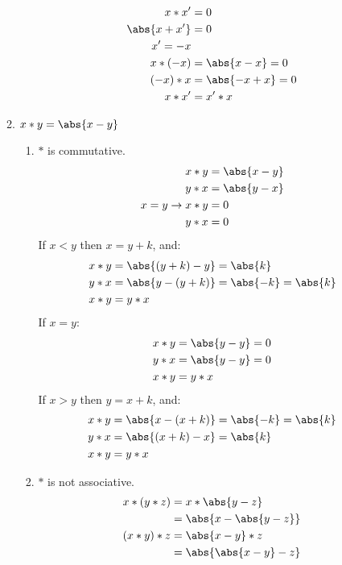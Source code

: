 \begin{enumerate}[label={\Alph*.},font={\bfseries}]
\begin{enumerate}[label={\arabic*},font={\bfseries}]
\begin{enumerate}[label={(\roman*)}]
      \begin{align*}
        x*x^\prime &= 0 \\
        \abs{x+x^\prime} &= 0 \\
        x^\prime = -x \\
        x*(-x) &= \abs{x-x} = 0 \\
        (-x)*x &= \abs{-x+x} = 0 \\
        x*x^\prime &= x^\prime*x
      \end{align*}
    \end{enumerate}
  \item $x*y=\abs{x-y}$
    \begin{enumerate}[label={(\roman*)}]
    \item $*$ is commutative.
      \begin{align*}
        x*y &= \abs{x-y} \\
        y*x &= \abs{y-x} \\
        x=y \to x*y &= 0 \\
        y*x &= 0 \\
      \end{align*}
      If $x<y$ then $x=y+k$, and:
      \begin{align*}
        x*y &= \abs{(y+k)-y} = \abs{k} \\
        y*x &= \abs{y-(y+k)} = \abs{-k} = \abs{k} \\
        x*y &= y*x
      \end{align*}
      If $x=y$:
      \begin{align*}
        x*y &= \abs{y-y} = 0 \\
        y*x &= \abs{y-y} = 0 \\
        x*y &= y*x
      \end{align*}
      If $x>y$ then $y=x+k$, and:
      \begin{align*}
        x*y &= \abs{x-(x+k)} = \abs{-k} = \abs{k}\\
        y*x &= \abs{(x+k)-x} = \abs{k} \\
        x*y &= y*x
      \end{align*}
    \item $*$ is not associative.
      \begin{align*}
        x*(y*z) &= x*\abs{y-z} \\
        &= \abs{x-\abs{y-z}} \\
        (x*y)*z &= \abs{x-y}*z \\
        &= \abs{\abs{x-y}-z} \\
      \end{align*}

\end{enumerate}
\end{enumerate}
\end{enumerate}
